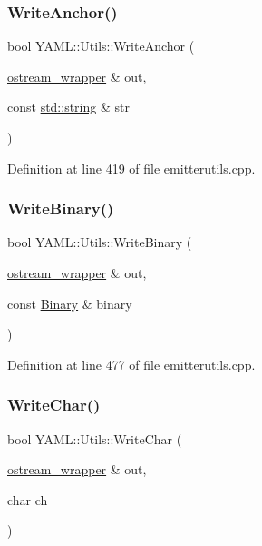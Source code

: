 \subsubsection{\texorpdfstring{WriteAnchor()}{WriteAnchor()}}
{\footnotesize\ttfamily bool Y\+A\+M\+L\+::\+Utils\+::\+Write\+Anchor (\begin{DoxyParamCaption}\item[{\mbox{\hyperlink{class_y_a_m_l_1_1ostream__wrapper}{ostream\+\_\+wrapper}} \&}]{out,  }\item[{const \mbox{\hyperlink{glad_8h_ac83513893df92266f79a515488701770}{std\+::string}} \&}]{str }\end{DoxyParamCaption})}



Definition at line 419 of file emitterutils.\+cpp.

\mbox{\label{namespace_y_a_m_l_1_1_utils_a545fdb750b68169d5cb818cd4eedde21}} 
\subsubsection{\texorpdfstring{WriteBinary()}{WriteBinary()}}
{\footnotesize\ttfamily bool Y\+A\+M\+L\+::\+Utils\+::\+Write\+Binary (\begin{DoxyParamCaption}\item[{\mbox{\hyperlink{class_y_a_m_l_1_1ostream__wrapper}{ostream\+\_\+wrapper}} \&}]{out,  }\item[{const \mbox{\hyperlink{class_y_a_m_l_1_1_binary}{Binary}} \&}]{binary }\end{DoxyParamCaption})}



Definition at line 477 of file emitterutils.\+cpp.

\mbox{\label{namespace_y_a_m_l_1_1_utils_a7ddff3f9bbcb646955d41bde78cf1d6d}} 
\subsubsection{\texorpdfstring{WriteChar()}{WriteChar()}}
{\footnotesize\ttfamily bool Y\+A\+M\+L\+::\+Utils\+::\+Write\+Char (\begin{DoxyParamCaption}\item[{\mbox{\hyperlink{class_y_a_m_l_1_1ostream__wrapper}{ostream\+\_\+wrapper}} \&}]{out,  }\item[{char}]{ch }\end{DoxyParamCaption})}



